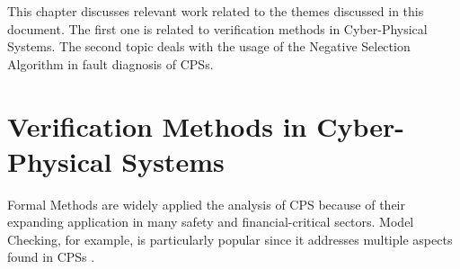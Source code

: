 








This chapter discusses relevant work related to the themes discussed in this document. The first one is related to verification methods in Cyber-Physical Systems. The second topic deals with the usage of the Negative Selection Algorithm in fault diagnosis of CPSs.

\section{Verification Methods in Cyber-Physical Systems}

Formal Methods are widely applied the analysis of CPS because of their expanding application in many safety and financial-critical sectors. Model Checking, for example, is particularly popular since it addresses multiple aspects found in CPSs \cite{2014PerceptionsSOTAV&VCPS}.

